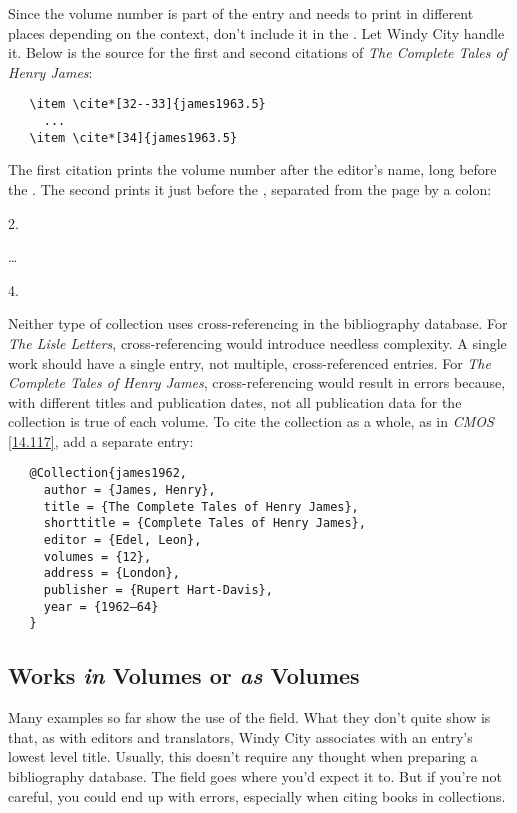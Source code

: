 \documentclass[11pt,letterpaper,oneside]{article}
\begin{document}
Since the volume number is part of the entry and needs to print in
different places depending on the context, don't include it in the
. Let Windy City handle it. Below is the source for
the first and second citations of \textit{The Complete Tales of Henry
James}:

\begin{verbatim}
   \item \cite*[32--33]{james1963.5}
     ...
   \item \cite*[34]{james1963.5}
\end{verbatim}

\noindent The first citation prints the volume number after the
editor's name, long before the . The second prints
it just before the , separated from the page by a
colon:

\begin{citeonly}
\item[2.] \cite*[32--33]{james1963.5}
\item[\ldots]
\item[4.] \cite*[34]{james1963.5}
\end{citeonly}

Neither type of collection uses cross-referencing in the bibliography
database. For \textit{The Lisle Letters}, cross-referencing would
introduce needless complexity. A single work should have a single
entry, not multiple, cross-referenced entries. For \textit{The
Complete Tales of Henry James}, cross-referencing would result in
errors because, with different titles and publication dates, not all
publication data for the collection is true of each volume. To cite
the collection as a whole, as in \textit{CMOS} \ref{14.117}, add a
separate entry:

\begin{verbatim}
   @Collection{james1962,
     author = {James, Henry},
     title = {The Complete Tales of Henry James},
     shorttitle = {Complete Tales of Henry James},
     editor = {Edel, Leon},
     volumes = {12},
     address = {London},
     publisher = {Rupert Hart-Davis},
     year = {1962–64}
   }
\end{verbatim}

\subsection{Works \textit{in} Volumes or \textit{as} Volumes}

Many examples so far show the use of the  field. What
they don't quite show is that, as with editors and translators, Windy
City associates  with an entry's lowest level title.
Usually, this doesn't require any thought when preparing a
bibliography database. The  field goes where you'd
expect it to. But if you're not careful, you could end up with errors,
especially when citing books in collections.
\end{document}
